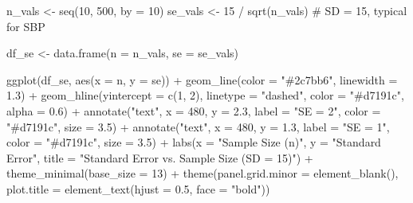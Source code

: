 \documentclass[
  12pt,
  letterpaper,
]{book}
\newenvironment{Shaded}{\begin{snugshade}}{\end{snugshade}}
\newcommand{\AttributeTok}[1]{\textcolor[rgb]{0.40,0.45,0.13}{#1}}
\newcommand{\CommentTok}[1]{\textcolor[rgb]{0.37,0.37,0.37}{#1}}
\newcommand{\DecValTok}[1]{\textcolor[rgb]{0.68,0.00,0.00}{#1}}
\newcommand{\FloatTok}[1]{\textcolor[rgb]{0.68,0.00,0.00}{#1}}
\newcommand{\FunctionTok}[1]{\textcolor[rgb]{0.28,0.35,0.67}{#1}}
\newcommand{\NormalTok}[1]{\textcolor[rgb]{0.00,0.23,0.31}{#1}}
\newcommand{\OtherTok}[1]{\textcolor[rgb]{0.00,0.23,0.31}{#1}}
\newcommand{\SpecialCharTok}[1]{\textcolor[rgb]{0.37,0.37,0.37}{#1}}
\newcommand{\StringTok}[1]{\textcolor[rgb]{0.13,0.47,0.30}{#1}}
\begin{document}
\begin{Shaded}
\begin{Highlighting}[]
\NormalTok{n\_vals }\OtherTok{\textless{}{-}} \FunctionTok{seq}\NormalTok{(}\DecValTok{10}\NormalTok{, }\DecValTok{500}\NormalTok{, }\AttributeTok{by =} \DecValTok{10}\NormalTok{)}
\NormalTok{se\_vals }\OtherTok{\textless{}{-}} \DecValTok{15} \SpecialCharTok{/} \FunctionTok{sqrt}\NormalTok{(n\_vals)   }\CommentTok{\# SD = 15, typical for SBP}

\NormalTok{df\_se }\OtherTok{\textless{}{-}} \FunctionTok{data.frame}\NormalTok{(}\AttributeTok{n =}\NormalTok{ n\_vals, }\AttributeTok{se =}\NormalTok{ se\_vals)}

\FunctionTok{ggplot}\NormalTok{(df\_se, }\FunctionTok{aes}\NormalTok{(}\AttributeTok{x =}\NormalTok{ n, }\AttributeTok{y =}\NormalTok{ se)) }\SpecialCharTok{+}
  \FunctionTok{geom\_line}\NormalTok{(}\AttributeTok{color =} \StringTok{"\#2c7bb6"}\NormalTok{, }\AttributeTok{linewidth =} \FloatTok{1.3}\NormalTok{) }\SpecialCharTok{+}
  \FunctionTok{geom\_hline}\NormalTok{(}\AttributeTok{yintercept =} \FunctionTok{c}\NormalTok{(}\DecValTok{1}\NormalTok{, }\DecValTok{2}\NormalTok{), }\AttributeTok{linetype =} \StringTok{"dashed"}\NormalTok{,}
             \AttributeTok{color =} \StringTok{"\#d7191c"}\NormalTok{, }\AttributeTok{alpha =} \FloatTok{0.6}\NormalTok{) }\SpecialCharTok{+}
  \FunctionTok{annotate}\NormalTok{(}\StringTok{"text"}\NormalTok{, }\AttributeTok{x =} \DecValTok{480}\NormalTok{, }\AttributeTok{y =} \FloatTok{2.3}\NormalTok{, }\AttributeTok{label =} \StringTok{"SE = 2"}\NormalTok{, }\AttributeTok{color =} \StringTok{"\#d7191c"}\NormalTok{, }\AttributeTok{size =} \FloatTok{3.5}\NormalTok{) }\SpecialCharTok{+}
  \FunctionTok{annotate}\NormalTok{(}\StringTok{"text"}\NormalTok{, }\AttributeTok{x =} \DecValTok{480}\NormalTok{, }\AttributeTok{y =} \FloatTok{1.3}\NormalTok{, }\AttributeTok{label =} \StringTok{"SE = 1"}\NormalTok{, }\AttributeTok{color =} \StringTok{"\#d7191c"}\NormalTok{, }\AttributeTok{size =} \FloatTok{3.5}\NormalTok{) }\SpecialCharTok{+}
  \FunctionTok{labs}\NormalTok{(}\AttributeTok{x =} \StringTok{"Sample Size (n)"}\NormalTok{, }\AttributeTok{y =} \StringTok{"Standard Error"}\NormalTok{,}
       \AttributeTok{title =} \StringTok{"Standard Error vs. Sample Size (SD = 15)"}\NormalTok{) }\SpecialCharTok{+}
  \FunctionTok{theme\_minimal}\NormalTok{(}\AttributeTok{base\_size =} \DecValTok{13}\NormalTok{) }\SpecialCharTok{+}
  \FunctionTok{theme}\NormalTok{(}\AttributeTok{panel.grid.minor =} \FunctionTok{element\_blank}\NormalTok{(),}
        \AttributeTok{plot.title =} \FunctionTok{element\_text}\NormalTok{(}\AttributeTok{hjust =} \FloatTok{0.5}\NormalTok{, }\AttributeTok{face =} \StringTok{"bold"}\NormalTok{))}
\end{Highlighting}
\end{Shaded}
\end{document}
